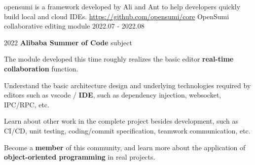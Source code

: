 

\begin{cventries}


\cventry
     {opensumi is a framework developed by Ali and Ant to help developers quickly build local and cloud IDEs. \href{https://github.com/opensumi/core}{https://github.com/opensumi/core}} %
     {OpenSumi collaborative editing module} %
     {} %
     {2022.07 - 2022.08} %
     {
       \begin{cvitems} %
         \item {2022 \textbf{Alibaba Summer of Code} subject}
         \item {The module developed this time roughly realizes the basic editor \textbf{real-time collaboration} function. }
         \item {Understand the basic architecture design and underlying technologies required by editors such as vscode / \textbf{IDE}, such as dependency injection, websocket, IPC/RPC, etc. }
         \item {Learn about other work in the complete project besides development, such as CI/CD, unit testing, coding/commit specification, teamwork communication, etc. }
         \item {Become a \textbf{member} of this community, and learn more about the application of \textbf{object-oriented programming} in real projects. }
       \end{cvitems}
     }



\end{cventries}
